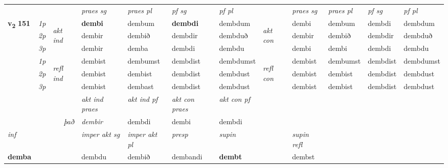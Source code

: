 \begin{longtable}[l]{X>{\footnotesize\itshape}llXXXXlXXXX}
 & &   & \textit{praes sg}  & \textit{praes pl}    & \textit{ pf sg} & \textit{pf pl} & & \textit{praes sg}  & \textit{praes pl}    & \textit{pf sg} & \textit{pf pl }  \\ \cmidrule{4-7} \cmidrule{9-12}
 \multirow{2}{*}{{{\textbf{v{\textsubscript{2}}} \Large{\textbf{151}}}}}  & 1p & \multirow{3}{*}{\begin{turn}{90}\textit{akt ind}\end{turn}} & \textbf{dembi} & dembum & \textbf{dembdi} & dembdum & \multirow{3}{*}{\begin{turn}{90}\textit{akt con}\end{turn}} &dembi & dembum & dembdi & dembdum\\*
 & 2p &  &  dembir  & dembið & dembdir & dembduð & & dembir & dembið & dembdir & dembduð \\*
 & 3p &  & dembir & demba & dembdi & dembdu & & dembi & dembi& dembdi & dembdu \\*
\cmidrule{4-7} \cmidrule{9-12}
 & 1p & \multirow{3}{*}{\begin{turn}{90}\textit{refl ind}\end{turn}}  & dembist & dembumst & dembdist & dembdumst & \multirow{3}{*}{\begin{turn}{90}\textit{refl con}\end{turn}}  &dembist & dembumst & dembdist & dembdumst \\*
 & 2p &  & dembist & dembist & dembdist & dembdust & &dembist & dembist & dembdist & dembdust \\*
 & 3p  & & dembist & dembast & dembdist & dembdust & & dembist & dembist& dembdist & dembdust \\*
\cmidrule{4-7} \cmidrule{9-12}

   && &  \textit{akt ind praes} & \textit{akt ind pf} & \textit{akt con praes} & \textit{akt con pf} \\*
\multicolumn{3}{r}{\textit{það}} & dembir & dembdi & dembi & dembdi \\*

\cmidrule{4-7}
   {\textit{inf}} & &  & \textit{imper akt sg} & \textit{imper akt pl}   & \textit{presp} & \textit{supin} && \textit{supin refl}  \\*
  {\textbf{demba}} & && dembdu  & dembið   & dembandi &  \textbf{dembt} && dembst  \\*

\midrule


\end{longtable}
